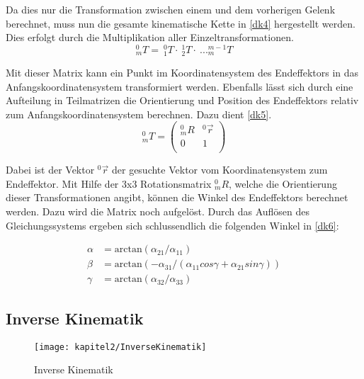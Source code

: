 Da dies nur die Transformation zwischen einem und dem vorherigen Gelenk berechnet, muss nun die gesamte kinematische Kette in \autoref{dk4} hergestellt werden. Dies erfolgt durch die Multiplikation aller Einzeltransformationen.
\begin{equation}
  ^{0}_{m}T =\: ^{0}_{1}T \cdot \: ^{1}_{2}T \cdot \: ... ^{m-1}_{m}T
\label{dk4}
\end{equation}

Mit dieser Matrix kann ein Punkt im Koordinatensystem des Endeffektors in das Anfangskoordinatensystem transformiert werden. Ebenfalls lässt sich durch eine Aufteilung in Teilmatrizen die Orientierung und Position des Endeffektors relativ zum Anfangskoordinatensystem berechnen. Dazu dient \autoref{dk5}.
\begin{equation}
  _{m}^{0}T = \begin{pmatrix}
    _{m}^{0}R & ^{0}\vec{r}\\
    0 & 1\\
  \end{pmatrix}
\label{dk5}
\end{equation}

Dabei ist der Vektor $^{0}\vec{r}$ der gesuchte Vektor vom Koordinatensystem zum Endeffektor. Mit Hilfe der 3x3 Rotationsmatrix $_{m}^{0}R$, welche die Orientierung dieser Transformationen angibt, können die Winkel des Endeffektors berechnet werden. Dazu wird die Matrix noch aufgelöst. Durch das Auflösen des Gleichungssystems ergeben sich schlussendlich die folgenden Winkel in \autoref{dk6}:

\begin{equation}
  \begin{aligned}
    \alpha & = \textrm{arctan}(\alpha_{21} / \alpha_{11}) \\
    \beta & = \textrm{arctan}(-\alpha_{31} / (\alpha_{11} cos \gamma + \alpha_{21} sin \gamma)) \\
    \gamma & = \textrm{arctan}(\alpha_{32} / \alpha_{33})
  \end{aligned}
\label{dk6}
\end{equation}

\subsection{Inverse Kinematik}

\begin{figure}[b!]
  \centering
  \texttt{[image: kapitel2/InverseKinematik]}
  \caption{Inverse Kinematik}
  \label{Kap2:inversekinematik}
\end{figure}

